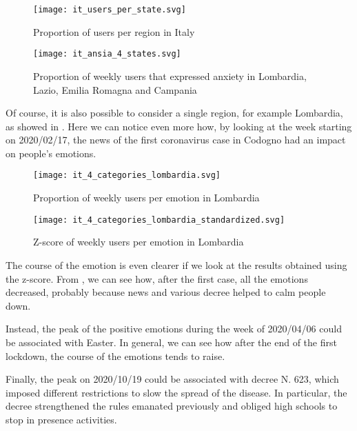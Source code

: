 \begin{figure}[H]
	\centering
    	\texttt{[image: it\_users\_per\_state.svg]}
    	\caption{Proportion of users per region in Italy}
    	\label{fig:it-users-state}
\end{figure}

\begin{figure}[H]
	\centering
    	\texttt{[image: it\_ansia\_4\_states.svg]}
    	\caption{Proportion of weekly users that expressed anxiety in Lombardia, Lazio, Emilia Romagna and Campania}
    	\label{fig:it-anger-4-states}
\end{figure}

Of course, it is also possible to consider a single region, for example Lombardia, as showed in . Here we can notice even more how, by looking at the week starting on 2020/02/17, the news of the first coronavirus case in Codogno had an impact on people's emotions.

\begin{figure}[H]
	\centering
    	\texttt{[image: it\_4\_categories\_lombardia.svg]}
    	\caption{Proportion of weekly users per emotion in Lombardia}
    	\label{fig:it-4-categories-lombardia}
\end{figure}

\begin{figure}[H]
	\centering
    	\texttt{[image: it\_4\_categories\_lombardia\_standardized.svg]}
    	\caption{Z-score of weekly users per emotion in Lombardia}
    	\label{fig:it-4-categories-lombardia-std}
\end{figure}

The course of the emotion is even clearer if we look at the results obtained using the z-score. From , we can see how, after the first case, all the emotions decreased, probably because news and various decree helped to calm people down.

Instead, the peak of the positive emotions during the week of 2020/04/06 could be associated with Easter. In general, we can see how after the end of the first lockdown, the course of the emotions tends to raise.

Finally, the peak on 2020/10/19 could be associated with decree N. 623, which imposed different restrictions to slow the spread of the disease. In particular, the decree strengthened the rules emanated previously and obliged high schools to stop in presence activities.